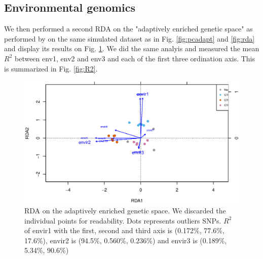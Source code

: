 \documentclass[nogrid]{MBE}%
\begin{document}
\subsection{Environmental genomics}

We then performed a second RDA on the "adaptively enriched genetic space" as performed by \citet{Steane2014a} on the same simulated dataset as in Fig. \ref{fig:pcadapt} and \ref{fig:rda} and display its results on Fig. \ref{fig:rdaA}. We did the same analyis and measured the mean $R^2$ between env1, env2 and env3 and each of the first three ordination axis. This is summarized in Fig. \ref{fig:R2}.

\begin{figure}[t]
\begin{center}
\includegraphics[height=0.4\textheight]{figures/rdaA.eps}
\end{center}
\caption{RDA on the adaptively enriched genetic space. We discarded the individual points for readability. Dots represents outliers SNPs.  $R^2$ of envir1 with the first, second and third axis is (0.172\%, 77.6\%, 17.6\%), envir2 is (94.5\%, 0.560\%, 0.236\%) and envir3 is (0.189\%, 5.34\%, 90.6\%)}%
\label{fig:rdaA}%
\end{figure}
\end{document}
